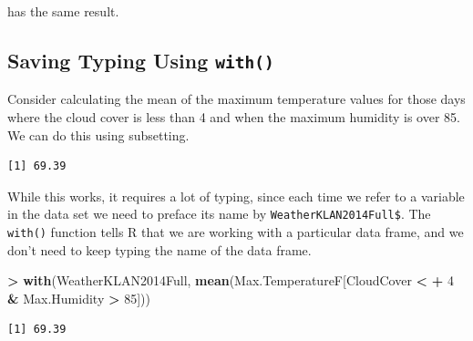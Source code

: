 \documentclass[]{krantz}
\makeatletter
\newenvironment{Shaded}{\begin{snugshade}}{\end{snugshade}}
\newcommand{\DecValTok}[1]{\textcolor[rgb]{0.06,0.06,0.06}{#1}}
\newcommand{\KeywordTok}[1]{\textcolor[rgb]{0.27,0.27,0.27}{\textbf{#1}}}
\newcommand{\NormalTok}[1]{#1}
\newcommand{\OperatorTok}[1]{\textcolor[rgb]{0.43,0.43,0.43}{\textbf{#1}}}
\newcommand{\StringTok}[1]{\textcolor[rgb]{0.5,0.5,0.5}{#1}}
\newenvironment{kframe}{%
\medskip{}
\setlength{\fboxsep}{.8em}
 \def\at@end@of@kframe{}%
 \ifinner\ifhmode%
  \def\at@end@of@kframe{\end{minipage}}%
  \begin{minipage}{\columnwidth}%
 \fi\fi%
 \def\FrameCommand##1{\hskip\@totalleftmargin \hskip-\fboxsep
 \colorbox{shadecolor}{##1}\hskip-\fboxsep
     \hskip-\linewidth \hskip-\@totalleftmargin \hskip\columnwidth}%
 \MakeFramed {\advance\hsize-\width
   \@totalleftmargin\z@ \linewidth\hsize
   \@setminipage}}%
 {\par\unskip\endMakeFramed%
 \at@end@of@kframe}
\renewenvironment{Shaded}{\begin{kframe}}{\end{kframe}}
\makeatother
\begin{document}
has the same result.

\hypertarget{saving-typing-using-with}{%
\subsection{\texorpdfstring{Saving Typing Using \texttt{with()}}{Saving Typing Using with()}}\label{saving-typing-using-with}}

Consider calculating the mean of the maximum temperature values for those days where the cloud cover is less than 4 and when the maximum humidity is over 85. We can do this using subsetting.

\begin{Shaded}
\end{Shaded}

\begin{verbatim}
[1] 69.39
\end{verbatim}

While this works, it requires a lot of typing, since each time we refer to a variable in the data set we need to preface its name by \texttt{WeatherKLAN2014Full\$}. The \texttt{with()} function tells R that we are working with a particular data frame, and we don't need to keep typing the name of the data frame.

\begin{Shaded}
\begin{Highlighting}[]
\OperatorTok{>}\StringTok{ }\KeywordTok{with}\NormalTok{(WeatherKLAN2014Full, }\KeywordTok{mean}\NormalTok{(Max.TemperatureF[CloudCover }\OperatorTok{<}\StringTok{ }
\OperatorTok{+}\StringTok{   }\DecValTok{4} \OperatorTok{&}\StringTok{ }\NormalTok{Max.Humidity }\OperatorTok{>}\StringTok{ }\DecValTok{85}\NormalTok{]))}
\end{Highlighting}
\end{Shaded}

\begin{verbatim}
[1] 69.39
\end{verbatim}
\end{document}
